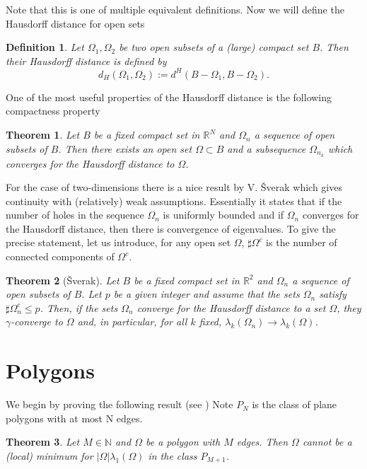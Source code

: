 \documentclass[12pt]{report}
\newtheorem{theorem}{Theorem}[section]
\newtheorem{definition}{Definition}
\numberwithin{definition}{section}
\begin{document}
Note that this is one of multiple equivalent definitions.
Now we will define the Hausdorff distance for open sets
\begin{definition}
  Let $\Omega_{1},\Omega_{2}$ be two open subsets of a (large) compact set $B$.
  Then their Hausdorff distance is defined by 
  \[
  d_{H}(\Omega_{1},\Omega_{2}) := d^{H}(B- \Omega_{1}, B - \Omega_{2})
  .\] 
\end{definition}

One of the most useful properties of the Hausdorff distance is the following compactness property\cite{convergence}
\begin{theorem} \label{comphaus}
  Let $B$ be a fixed compact set in $\mathbb{R}^{N}$ and $\Omega_{n}$ a sequence of open subsets of $B$.
  Then there exists an open set $\Omega \subset B$ and a subsequence $\Omega_{n_{k}}$ which converges for the Hausdorff distance to $\Omega$.
\end{theorem}

For the case of two-dimensions there is a nice result by V. Šverak which gives continuity with (relatively) weak assumptions\cite{sverak}.
Essentially it states that if the number of holes in the sequence $\Omega_{n}$ is uniformly bounded and if $\Omega_{n}$ converges for the Hausdorff distance, then there is convergence of eigenvalues.
To give the precise statement, let us introduce, for any open set $\Omega$, $\sharp \Omega^{c}$ is the number of connected components of $\Omega^{c}$.

\begin{theorem}[Šverak] \label{sverak}
  Let $B$ be a fixed compact set in $\mathbb{R}^{2}$ and $\Omega_{n}$ a sequence of open subsets of $B$.
  Let $p$ be a given integer and assume that the sets $\Omega_{n}$ satisfy $\sharp \Omega_{n}^{c} \leq p$.
  Then, if the sets $\Omega_{n}$ converge for the Hausdorff distance to a set $\Omega$, they $\gamma$-converge to $\Omega$ and, in particular, for all $k$ fixed, $\lambda_{k}(\Omega_{n}) \to \lambda_{k}(\Omega)$.
\end{theorem}

\break

\section{Polygons}

We begin by proving the following result (see \cite{henrot})
Note $P_{N}$ is the class of plane polygons with at most N edges.
\begin{theorem} \label{egm}
  Let $M \in \mathbb{N}$ and $\Omega$ be a polygon with $M$ edges.
  Then $\Omega$ cannot be a (local) minimum for $|\Omega| \lambda_{1}(\Omega)$ in the class $P_{M+1}$.
\end{theorem}
\end{document}
